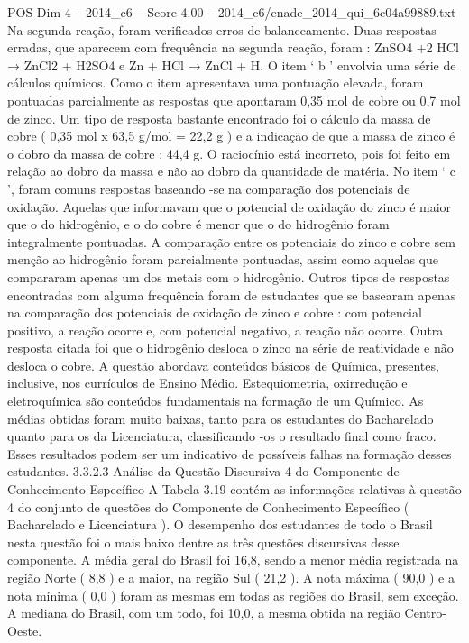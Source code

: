 \begin{textsample}{POS Dim 4 – 2014\_c6 – Score 4.00 – 2014\_c6/enade\_2014\_qui\_6c04a99889.txt}
Na segunda reação, foram verificados erros de balanceamento.
Duas respostas erradas, que aparecem com frequência na segunda reação, foram : ZnSO4 +2 HCl → ZnCl2 + H2SO4 e Zn + HCl → ZnCl + H.
O item ‘ b ’ envolvia uma série de cálculos químicos.
Como o item apresentava uma pontuação elevada, foram pontuadas parcialmente as respostas que apontaram 0,35 mol de cobre ou 0,7 mol de zinco.
Um tipo de resposta bastante encontrado foi o cálculo da massa de cobre ( 0,35 mol x 63,5 g/mol = 22,2 g ) e a indicação de que a massa de zinco é o dobro da massa de cobre : 44,4 g.
O raciocínio está incorreto, pois foi feito em relação ao dobro da massa e não ao dobro da quantidade de matéria.
No item ‘ c ’, foram comuns respostas baseando -se na comparação dos potenciais de oxidação.
Aquelas que informavam que o potencial de oxidação do zinco é maior que o do hidrogênio, e o do cobre é menor que o do hidrogênio foram integralmente pontuadas.
A comparação entre os potenciais do zinco e cobre sem menção ao hidrogênio foram parcialmente pontuadas, assim como aquelas que compararam apenas um dos metais com o hidrogênio.
Outros tipos de respostas encontradas com alguma frequência foram de estudantes que se basearam apenas na comparação dos potenciais de oxidação de zinco e cobre : com potencial positivo, a reação ocorre e, com potencial negativo, a reação não ocorre.
Outra resposta citada foi que o hidrogênio desloca o zinco na série de reatividade e não desloca o cobre.
A questão abordava conteúdos básicos de Química, presentes, inclusive, nos currículos de Ensino Médio.
Estequiometria, oxirredução e eletroquímica são conteúdos fundamentais na formação de um Químico.
As médias obtidas foram muito baixas, tanto para os estudantes do Bacharelado quanto para os da Licenciatura, classificando -os o resultado final como fraco.
Esses resultados podem ser um indicativo de possíveis falhas na formação desses estudantes. 3.3.2.3 Análise da Questão Discursiva 4 do Componente de Conhecimento Específico A Tabela 3.19 contém as informações relativas à questão 4 do conjunto de questões do Componente de Conhecimento Específico ( Bacharelado e Licenciatura ).
O desempenho dos estudantes de todo o Brasil nesta questão foi o mais baixo dentre as três questões discursivas desse componente.
A média geral do Brasil foi 16,8, sendo a menor média registrada na região Norte ( 8,8 ) e a maior, na região Sul ( 21,2 ).
A nota máxima ( 90,0 ) e a nota mínima ( 0,0 ) foram as mesmas em todas as regiões do Brasil, sem exceção.
A mediana do Brasil, com um todo, foi 10,0, a mesma obtida na região Centro-Oeste.

\end{textsample}

